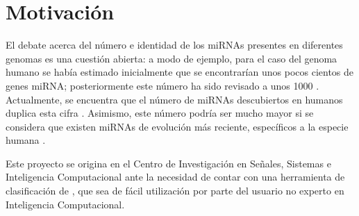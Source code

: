 %
%
%
\section{Motivación}
%

El debate acerca del número e identidad de los miRNAs presentes en
diferentes genomas es una cuestión abierta: a modo de ejemplo, para el
caso del genoma humano se había estimado inicialmente que se
encontrarían unos pocos cientos de genes miRNA; posteriormente este
número ha sido revisado a unos 1000 \cite{sewer,chang}.
Actualmente, se encuentra que el número de miRNAs descubiertos en
humanos duplica esta cifra \cite{gomes}.
Asimismo, este número podría ser mucho mayor si se considera que
existen miRNAs de evolución más reciente, específicos a la especie
humana \cite{sewer}.



Este proyecto se origina en el Centro de Investigación en Señales, 
Sistemas e Inteligencia Computacional  ante la necesidad de
contar con  una herramienta de clasificación de , que sea
de fácil utilización por parte del usuario no experto en Inteligencia
Computacional.

